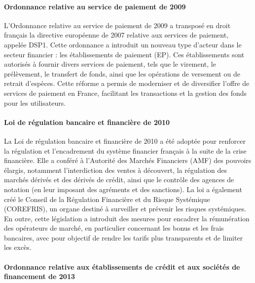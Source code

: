 \documentclass[a4paper, 12pt]{report}
\begin{document}
\paragraph{Ordonnance relative au service de paiement de 2009}

L'Ordonnance relative au service de paiement de 2009 a transposé en droit français la directive européenne de 2007 relative aux services de paiement, appelée DSP1. Cette ordonnance a introduit un nouveau type d'acteur dans le secteur financier : les établissements de paiement (EP). Ces établissements sont autorisés à fournir divers services de paiement, tels que le virement, le prélèvement, le transfert de fonds, ainsi que les opérations de versement ou de retrait d’espèces. Cette réforme a permis de moderniser et de diversifier l’offre de services de paiement en France, facilitant les transactions et la gestion des fonds pour les utilisateurs.

\paragraph{Loi de régulation bancaire et financière de 2010}

La Loi de régulation bancaire et financière de 2010 a été adoptée pour renforcer la régulation et l'encadrement du système financier français à la suite de la crise financière. Elle a conféré à l'Autorité des Marchés Financiers (AMF) des pouvoirs élargis, notamment l'interdiction des ventes à découvert, la régulation des marchés dérivés et des dérivés de crédit, ainsi que le contrôle des agences de notation (en leur imposant des agréments et des sanctions). La loi a également créé le Conseil de la Régulation Financière et du Risque Systémique (COREFRIS), un organe destiné à surveiller et prévenir les risques systémiques. En outre, cette législation a introduit des mesures pour encadrer la rémunération des opérateurs de marché, en particulier concernant les bonus et les frais bancaires, avec pour objectif de rendre les tarifs plus transparents et de limiter les excès.

\paragraph{Ordonnance relative aux établissements de crédit et aux sociétés de financement de 2013}
\end{document}
